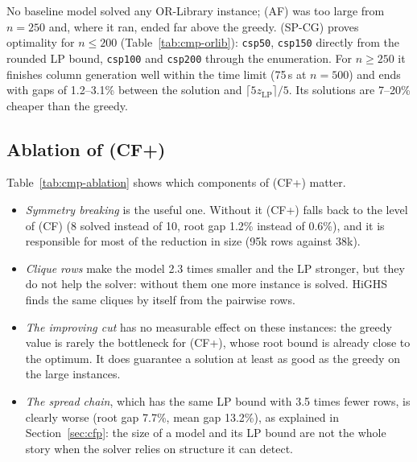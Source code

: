 No baseline model solved any OR-Library instance; (AF) was too large from
$n=250$ and, where it ran, ended far above the greedy. (SP-CG) proves
optimality for $n\le200$ (Table~\ref{tab:cmp-orlib}): \texttt{csp50},
\texttt{csp150} directly from the rounded LP bound, \texttt{csp100} and
\texttt{csp200} through the enumeration. For $n\ge250$ it finishes column
generation well within the time limit (75\,s at $n=500$) and ends with gaps
of 1.2--3.1\% between the solution and $\lceil 5z_{\mathrm{LP}}\rceil/5$. Its
solutions are 7--20\% cheaper than the greedy.

\subsection{Ablation of (CF+)}
\label{sec:ablation}

\begin{table}[ht]
\centering
\small
\setlength{\tabcolsep}{4pt}
\caption{Ablation on the 15 scale instances with $40\le n\le100$: (CF+) with
one component removed (or, for the spread chain, replaced). Mean time
(300 for unsolved runs), mean root gap, median nodes of all runs, mean number
of constraints, mean final gap.}
\label{tab:cmp-ablation}

\end{table}

Table~\ref{tab:cmp-ablation} shows which components of (CF+) matter.
\begin{itemize}[nosep]
  \item \emph{Symmetry breaking} is the useful one. Without it (CF+) falls
    back to the level of (CF) (8 solved instead of 10, root gap 1.2\%
    instead of 0.6\%), and it is responsible for most of the reduction in
    size (95k rows against 38k).
  \item \emph{Clique rows} make the model 2.3 times smaller and the LP
    stronger, but they do not help the solver: without them one more
    instance is solved. HiGHS finds the same cliques by itself from the
    pairwise rows.
  \item \emph{The improving cut} has no measurable effect on these
    instances: the greedy value is rarely the bottleneck for (CF+), whose
    root bound is already close to the optimum. It does guarantee a
    solution at least as good as the greedy on the large instances.
  \item \emph{The spread chain}, which has the same LP bound with 3.5 times
    fewer rows, is clearly worse (root gap 7.7\%, mean gap 13.2\%), as
    explained in Section~\ref{sec:cfp}: the size of a model and its LP bound
    are not the whole story when the solver relies on structure it can
    detect.
\end{itemize}

